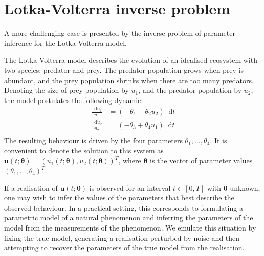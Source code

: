\documentclass[11pt,a4paper]{report}
\newcommand*\diff{\mathop{}\!\mathrm{d}}
\begin{document}
\section{Lotka-Volterra inverse problem}
\label{sec:lotka-volterra}

A more challenging case is presented by the inverse problem of parameter inference for the Lotka-Volterra model.


The Lotka-Volterra model describes the evolution of an idealised ecosystem with two species: predator and prey. The predator population grows when prey is abundant, and the prey population shrinks when there are too many predators. Denoting the size of prey population by $u_1$, and the predator population by $u_2$, the model postulates the following dynamic:
\begin{equation}
\begin{aligned}
\frac{\diff u_1}{u_1} & = ( \;\;\;\theta_1 - \theta_2 u_2 ) \diff t \\
\frac{\diff u_2}{u_2} & = ( -\theta_3 + \theta_4 u_1 ) \diff t \\
\end{aligned}
\label{eq:lotka-volterra}
\end{equation}
The resulting behaviour is driven by the four parameters $\theta_1, \dots, \theta_4$. It is convenient to denote the solution to this system as  $\mathbf{u}(t;\pmb{\theta}) = (u_1(t; \pmb{\theta}), u_2(t; \pmb{\theta}))^T$, where $\pmb{\theta}$ is the vector of parameter values $(\theta_1, \dots, \theta_4)^T$.

If a realisation of $\mathbf{u}(t; \pmb{\theta})$ is observed for an interval $t \in [0, T]$ with $\pmb{\theta}$ unknown, one may wish to infer the values of the parameters that best describe the observed behaviour. In a practical setting, this corresponds to formulating a parametric model of a natural phenomenon and inferring the parameters of the model from the measurements of the phenomenon. We emulate this situation by fixing the true model, generating a realisation perturbed by noise and then attempting to recover the parameters of the true model from the realisation.
\end{document}
